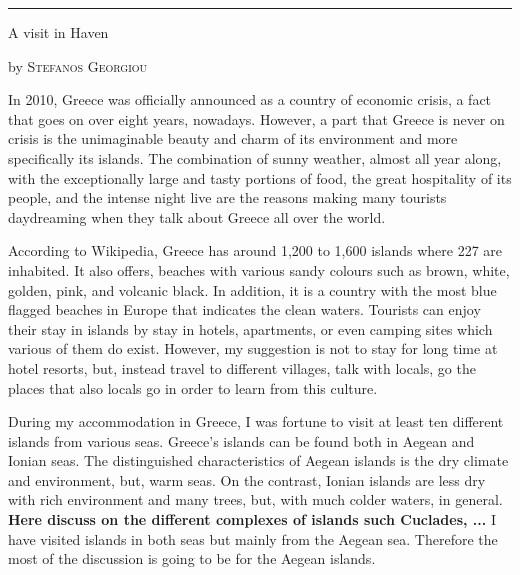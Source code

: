 \documentclass[10pt,a4paper]{article} %
\newcommand{\SepRule}{\noindent	%
\begin{center}
\rule{250pt}{1pt} %
\end{center}
}
\newcommand{\NewsItem}[1]{ %
\usefont{T1}{fvs}{n}{n} %
\vspace{24pt}\large #1\vspace{3pt} %
\par \normalsize \normalfont}
\newcommand{\NewsAuthor}[1]{ %
\hfill by \textsc{#1} \vspace{20pt} %
\par \normalfont}
\begin{document}
\vspace{0.5cm}
\SepRule %
\vspace{0.5cm}

\begin{multicols}{3} %


\NewsItem{A visit in Haven}
\NewsAuthor{Stefanos Georgiou}

In 2010, Greece was officially announced as a country of economic crisis, 
a fact that goes on over eight years, nowadays. 
However, a part that Greece is never on crisis is the unimaginable beauty and charm 
of its environment and more specifically its islands. 
The combination of sunny weather, almost all year along, with the exceptionally 
large and tasty portions of food, the great hospitality of its people, and the 
intense night live are the reasons making many tourists daydreaming when they talk 
about Greece all over the world.  


According to Wikipedia, Greece has around 1,200 to 1,600 islands where 227 
are inhabited. 
It also offers, beaches with various sandy colours such as brown, white, golden, 
pink, and volcanic black. 
In addition, it is a country with the most blue flagged beaches in Europe that 
indicates the clean waters. 
Tourists can enjoy their stay in islands by stay in hotels, apartments, or even 
camping sites which various of them do exist. 
However, my suggestion is not to stay for long time at hotel resorts, but, instead 
travel to different villages, talk with locals, go the places that also locals 
go in order to learn from this culture.  


During my accommodation in Greece, I was fortune to visit at least ten different 
islands from various seas. 
Greece's islands can be found both in Aegean and Ionian seas. 
The distinguished characteristics of Aegean islands is the dry climate and 
environment, but, warm seas. 
On the contrast, Ionian islands are less dry with rich environment and many 
trees, but, with much colder waters, in general. 
\textbf{Here discuss on the different complexes of islands such Cuclades, ...}
I have visited islands in both seas but mainly from the Aegean sea. 
Therefore the most of the discussion is going to be for the Aegean islands. 



\end{multicols}
\end{document}
